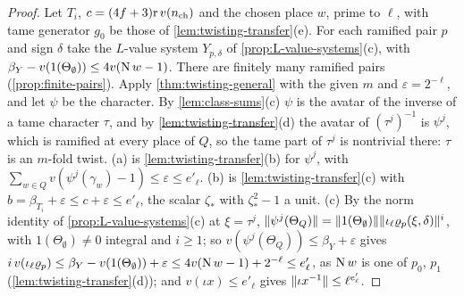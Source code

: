 \begin{proof}
Let $T_i$, $c=(4f+3)\mathrm r\,v(n_{\rm ch})$ and the chosen place $w$, prime to $\ell$, with tame generator $g_0$ be those of \cref{lem:twisting-transfer}(e). For each ramified pair $p$ and sign $\delta$ take the $L$-value system $Y_{p,\delta}$ of \cref{prop:L-value-systems}(c), with $\beta_Y-v(1(\Theta_\emptyset))\le4v(\operatorname{N} w-1)$. There are finitely many ramified pairs (\cref{prop:finite-pairs}). Apply
\cref{thm:twisting-general} with the given $m$ and $\varepsilon=2^{-\ell}$, and let $\psi$ be the character. By \cref{lem:class-sums}(c) $\psi$ is the avatar of the inverse of a tame character $\tau$, and by \cref{lem:twisting-transfer}(d) the avatar of $(\tau^j)^{-1}$ is $\psi^j$, which is ramified at every place of $Q$, so the tame part of $\tau^j$ is
nontrivial there: $\tau$ is an $m$-fold twist. (a) is \cref{lem:twisting-transfer}(b) for $\psi^j$, with $\sum_{w\in Q}v(\psi^j(\gamma_w)-1)\le\varepsilon\le e'_\ell$. (b) is \cref{lem:twisting-transfer}(c) with $b=\beta_{T_i}+\varepsilon\le c+\varepsilon\le e'_\ell$, the scalar $\zeta_*$ with $\zeta_*^2-1$ a unit. (c) By the norm identity of
\cref{prop:L-value-systems}(c) at $\xi=\tau^j$, $\lVert \psi^j(\Theta_Q)\rVert=\lVert 1(\Theta_\emptyset)\rVert\lVert \iota_\ell\varrho_p(\xi,\delta)\rVert^i$, with $1(\Theta_\emptyset)\ne0$ integral and $i\ge1$; so $v(\psi^j(\Theta_Q))\le\beta_Y+\varepsilon$ gives
$i\,v(\iota_\ell\varrho_p)\le\beta_Y-v(1(\Theta_\emptyset))+\varepsilon\le4v(\operatorname{N} w-1)+2^{-\ell}\le e'_\ell$, as $\operatorname{N} w$ is one of $p_0$, $p_1$ (\cref{lem:twisting-transfer}(d)); and $v(\iota x)\le e'_\ell$ gives $\lVert \iota x^{-1}\rVert\le\ell^{e'_\ell}$.
\end{proof}
